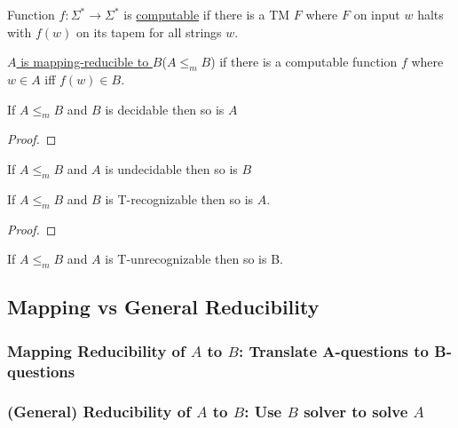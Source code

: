 \begin{definition}
    Function \(f: \Sigma^* \rightarrow \Sigma^*\) is \underline{computable} if there is a TM \(F\) where \(F\) on input \(w\) halts with \(f(w)\) on its tapem for all strings \(w\).     
\end{definition}

\begin{definition}
    \underline{\(A\) is mapping-reducible to \(B\)}(\(A \leq_m B\)) if there is a computable function \(f\) where \(w \in A\) iff \(f(w) \in B\).   
\end{definition}

\begin{example}
    
\end{example}

\begin{theorem}
    If \(A \leq_m B\) and \(B\) is decidable then so is \(A\)   
\end{theorem}
\begin{proof}
    
\end{proof}

\begin{corollary}
    If \(A \leq_m B\) and \(A\) is undecidable then so is \(B\)   
\end{corollary}

\begin{theorem}
    If \(A \leq_m B\) and \(B\) is T-recognizable then so is \(A\).   
\end{theorem}
\begin{proof}
    
\end{proof}

\begin{corollary}
    If \(A \leq_m B\) and \(A\) is T-unrecognizable then so is B. 
\end{corollary}

\subsection{Mapping vs General Reducibility}

\subsubsection{Mapping Reducibility of \(A\) to \(B\): Translate A-questions to B-questions}

\subsubsection{(General) Reducibility of \(A\) to \(B\): Use \(B\) solver to solve \(A\)}

